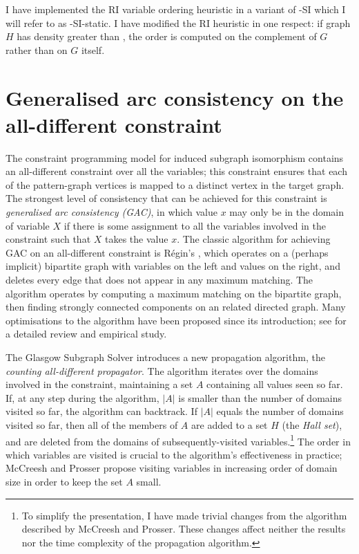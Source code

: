 I have implemented the RI variable ordering heuristic in a variant of \McSplit-SI
which I will refer to as \McSplit-SI-static.  I have modified the RI heuristic
in one respect: if graph $H$ has density greater than , the order
is computed on the complement of $G$ rather than on $G$ itself.

\section{Generalised arc consistency on the all-different constraint}\label{sec:mcsplit-si-gac}

The constraint programming model for induced subgraph isomorphism contains an all-different
constraint over all the variables; this constraint ensures that each of the pattern-graph vertices
is mapped to a distinct vertex in the target graph.  The strongest level of consistency that can
be achieved for this constraint is \emph{generalised arc consistency (GAC)}, in which value
$x$ may only be in the domain of variable $X$ if there is some assignment to all
the variables involved in the constraint such that $X$ takes the value $x$.
The classic algorithm for achieving GAC on an all-different constraint is R\'egin's
\cite{DBLP:conf/aaai/Regin94}, which operates
on a (perhaps implicit) bipartite graph with variables on the left and values on the right, and 
deletes every edge that does not appear in any maximum matching.  The algorithm operates by computing
a maximum matching on the bipartite graph, then finding strongly connected components on an related directed
graph.  Many optimisations to the algorithm have been proposed since its introduction; see
\cite{DBLP:journals/ai/GentMN08} for a detailed review and empirical study.

The Glasgow Subgraph Solver \cite{DBLP:conf/cp/McCreeshP15} introduces a new propagation algorithm,
the \emph{counting all-different propagator}.
The algorithm iterates over the domains involved in the constraint, maintaining a set $A$ containing
all values seen so far.  If, at any step during the algorithm, $|A|$ is smaller than the number
of domains visited so far, the algorithm can backtrack.  If $|A|$ equals the number of domains visited
so far, then all of the members of $A$ are added to a set $H$ (the \emph{Hall set}), and are deleted from
the domains of subsequently-visited variables.\footnote{To simplify the presentation,
I have made trivial changes from the algorithm described by McCreesh and Prosser.
These changes affect neither the results nor the time complexity of the propagation algorithm.}
The order in which variables are visited is crucial
to the algorithm's effectiveness in practice; McCreesh and Prosser
propose visiting variables in increasing order of domain size in order to keep the set $A$ small.

